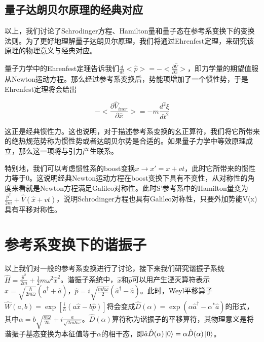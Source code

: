 \documentclass[a4paper]{article}
\begin{document}
    \subsection{量子达朗贝尔原理的经典对应}

        以上，我们讨论了Schrodinger方程、Hamilton量和量子态在参考系变换下的变换法则。为了更好地理解量子达朗贝尔原理，我们将通过Ehrenfest定理，来研究该原理的物理意义与经典对应。

        量子力学中的Ehrenfest定理告诉我们$\frac{d}{dt}<\hat{p}>=-<\frac{\partial\hat{V}}{\partial \hat{x}}>$，即力学量的期望值服从Newton运动方程。那么经过参考系变换后，势能项增加了一个惯性势，于是Ehrenfest定理将会给出
        
        \begin{equation}
            -<\frac{\partial\hat{V}_{iner}}{\partial \hat{x}}>=-m \frac{d^2\xi}{d t^2}
        \end{equation}
        
        这正是经典惯性力。这也说明，对于描述参考系变换的幺正算符，我们将它所带来的绝热规范势称为惯性势或者达朗贝尔势是合适的。如果量子力学中等效原理成立，那么这一项将与引力产生联系。
        
        特别地，我们可以考虑惯性系的boost变换$x\rightarrow x'=x+vt$，此时它所带来的惯性力等于0。这说明经典Newton运动方程在boost变换下具有不变性，从对称性的角度来看就是Newton方程满足Galileo对称性。此时S'参考系中的Hamilton量变为$\frac{\hat{p}^2}{2m}+\hat{V}(\hat{x}+vt)$，说明Schrodinger方程也具有Galileo对称性，只要外加势能V(x)具有平移对称性。



    \section{参考系变换下的谐振子}

        以上我们对一般的参考系变换进行了讨论，接下来我们研究谐振子系统$\hat{H}=\frac{\hat{p}^2}{2m}+\frac{1}{2}m\omega^2\hat{x}^2$。谐振子系统中，$\hat{x}$和$\hat{p}$可以用产生湮灭算符表示$\hat{x}=\sqrt{\frac{\hbar}{2m\omega}}(\hat{a}^\dagger+\hat{a})$，$\hat{p}=i\sqrt{\frac{m\hbar\omega}{2}}(\hat{a}^\dagger-\hat{a})$。此时，Weyl平移算子$\hat{W}(a,b)=\exp[\frac{i}{\hbar}(a\hat{x}-b\hat{p})]$将会变成$\hat{D}(\alpha)=\exp(\alpha\hat{a}^\dagger-\alpha^*\hat{a})$的形式，其中$\alpha=b\sqrt{\frac{m\omega}{2\hbar}}+i\frac{a}{\sqrt{2m\hbar\omega}}$。$\hat{D}(\alpha)$算符称为谐振子的平移算符，其物理意义是将谐振子基态变换为本征值等于$\alpha$的相干态，即$\hat{a}\hat{D}(\alpha)\ket{0}=\alpha\hat{D}(\alpha)\ket{0}$。
\end{document}
